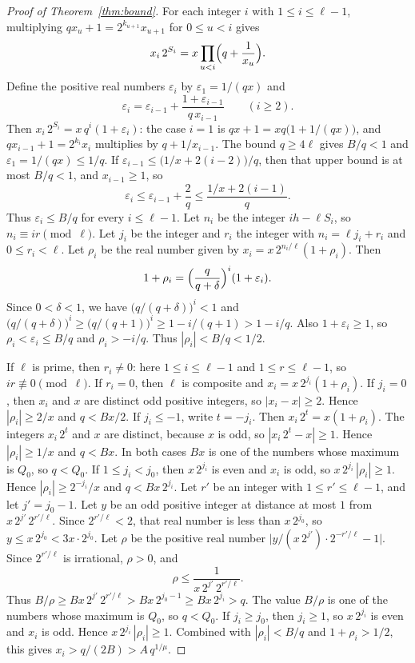\documentclass[11pt]{article}
\begin{document}
\begin{proof}[Proof of Theorem~\ref{thm:bound}]
For each integer $i$ with $1 \le i \le \ell-1$, multiplying $q x_u + 1 = 2^{k_{u+1}} x_{u+1}$ for $0 \le u < i$ gives
\[
x_i\, 2^{S_i} = x \prod_{u < i}\Bigl(q + \frac{1}{x_u}\Bigr).
\]
Define the positive real numbers $\varepsilon_i$ by $\varepsilon_1 = 1/(qx)$ and
\[
\varepsilon_i = \varepsilon_{i-1} + \frac{1+\varepsilon_{i-1}}{q\, x_{i-1}}
\qquad (i \ge 2).
\]
Then $x_i\, 2^{S_i} = x\, q^i(1+\varepsilon_i)$: the case $i = 1$ is $qx + 1 = xq\bigl(1 + 1/(qx)\bigr)$, and $q x_{i-1} + 1 = 2^{k_i} x_i$ multiplies by $q + 1/x_{i-1}$.
The bound $q \ge 4\ell$ gives $B/q < 1$ and $\varepsilon_1 = 1/(qx) \le 1/q$.
If $\varepsilon_{i-1} \le \bigl(1/x + 2(i-2)\bigr)/q$, then that upper bound is at most $B/q < 1$, and $x_{i-1} \ge 1$, so
\[
\varepsilon_i \le \varepsilon_{i-1} + \frac{2}{q} \le \frac{1/x + 2(i-1)}{q}.
\]
Thus $\varepsilon_i \le B/q$ for every $i \le \ell-1$.
Let $n_i$ be the integer $ih - \ell S_i$, so $n_i \equiv ir \pmod{\ell}$.
Let $j_i$ be the integer and $r_i$ the integer with $n_i = \ell j_i + r_i$ and $0 \le r_i < \ell$.
Let $\rho_i$ be the real number given by $x_i = x\, 2^{n_i/\ell}(1+\rho_i)$.
Then
\[
1+\rho_i = \Bigl(\frac{q}{q+\delta}\Bigr)^i (1+\varepsilon_i).
\]
Since $0 < \delta < 1$, we have $\bigl(q/(q+\delta)\bigr)^i < 1$ and $\bigl(q/(q+\delta)\bigr)^i \ge \bigl(q/(q+1)\bigr)^i \ge 1 - i/(q+1) > 1 - i/q$.
Also $1+\varepsilon_i \ge 1$, so $\rho_i < \varepsilon_i \le B/q$ and $\rho_i > -i/q$.
Thus $|\rho_i| < B/q < 1/2$.

If $\ell$ is prime, then $r_i \ne 0$: here $1 \le i \le \ell-1$ and $1 \le r \le \ell-1$, so $ir \not\equiv 0 \pmod{\ell}$.
If $r_i = 0$, then $\ell$ is composite and $x_i = x\, 2^{j_i}(1+\rho_i)$.
If $j_i = 0$, then $x_i$ and $x$ are distinct odd positive integers, so $|x_i - x| \ge 2$.
Hence $|\rho_i| \ge 2/x$ and $q < Bx/2$.
If $j_i \le -1$, write $t = -j_i$.
Then $x_i\, 2^{t} = x(1+\rho_i)$.
The integers $x_i\, 2^{t}$ and $x$ are distinct, because $x$ is odd, so $|x_i\, 2^{t} - x| \ge 1$.
Hence $|\rho_i| \ge 1/x$ and $q < Bx$.
In both cases $Bx$ is one of the numbers whose maximum is $Q_0$, so $q < Q_0$.
If $1 \le j_i < j_0$, then $x\, 2^{j_i}$ is even and $x_i$ is odd, so $x\, 2^{j_i}\, |\rho_i| \ge 1$.
Hence $|\rho_i| \ge 2^{-j_i}/x$ and $q < Bx\, 2^{j_i}$.
Let $r'$ be an integer with $1 \le r' \le \ell - 1$, and let $j' = j_0 - 1$.
Let $y$ be an odd positive integer at distance at most $1$ from $x\, 2^{j'}\, 2^{r'/\ell}$.
Since $2^{r'/\ell} < 2$, that real number is less than $x\, 2^{j_0}$, so $y \le x\, 2^{j_0} < 3x \cdot 2^{j_0}$.
Let $\rho$ be the positive real number $\bigl| y/(x\, 2^{j'}) \cdot 2^{-r'/\ell} - 1 \bigr|$.
Since $2^{r'/\ell}$ is irrational, $\rho > 0$, and
\[
\rho \le \frac{1}{x\, 2^{j'}\, 2^{r'/\ell}}.
\]
Thus $B/\rho \ge Bx\, 2^{j'}\, 2^{r'/\ell} > Bx\, 2^{j_0 - 1} \ge Bx\, 2^{j_i} > q$.
The value $B/\rho$ is one of the numbers whose maximum is $Q_0$, so $q < Q_0$.
If $j_i \ge j_0$, then $j_i \ge 1$, so $x\, 2^{j_i}$ is even and $x_i$ is odd.
Hence $x\, 2^{j_i}\, |\rho_i| \ge 1$.
Combined with $|\rho_i| < B/q$ and $1+\rho_i > 1/2$, this gives $x_i > q/(2B) > A\, q^{1/\mu}$.


\end{proof}
\end{document}
